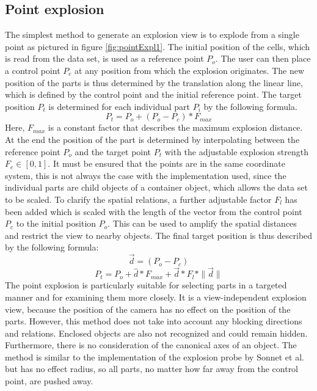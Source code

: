 \subsection{Point explosion}
The simplest method to generate an explosion view is to explode from a single point as pictured in figure \ref{fig:pointExpl1}.
The initial position of the cells, which is read from the data set, is used as a reference point $P_o$. 
The user can then place a control point $P_c$ at any position from which the explosion originates. 
The new position of the parts is thus determined by the translation along the linear line, which is defined by the control point and the initial reference point.
The target position $P_t$ is determined for each individual part $P_i$ by the following formula. 
\begin{equation}
	P_t = P_o + (P_o - P_c) * F_{max}
	\label{eq:pointExpl1}
\end{equation}
Here, $F_{max}$ is a constant factor that describes the maximum explosion distance. At the end the position of the part is determined by interpolating between the reference point $P_o$ and the target point $P_t$ with the adjustable explosion strength $F_e \in [0, 1]$.
It must be ensured that the points are in the same coordinate system, this is not always the case with the implementation used, since the individual parts are child objects of a container object, which allows the data set to be scaled.
To clarify the spatial relations, a further adjustable factor $F_l$ has been added which is scaled with the length of the vector from the control point $P_c$ to the initial position $P_o$. This can be used to amplify the spatial distances and restrict the view to nearby objects.
The final target position is thus described by the following formula:
\begin{equation}
	\vec{d} = (P_o - P_c) 
	\label{eq:pointExpl2}
\end{equation}
\begin{equation} 
	P_t = P_o + \hat{d} * F_{max} + \vec{d} * F_l * \|\vec{d}\|
	\label{eq:pointExpl3}
\end{equation}
The point explosion is particularly suitable for selecting parts in a targeted manner and for examining them more closely.
It is a view-independent explosion view, because the position of the camera has no effect on the position of the parts. 
However, this method does not take into account any blocking directions and relations. 
Enclosed objects are also not recognized and could remain hidden.
Furthermore, there is no consideration of the canonical axes of an object.
The method is similar to the implementation of the explosion probe by Sonnet et al.\cite{Sonnet_2004} but has no effect radius, so all parts, no matter how far away from the control point, are pushed away.

